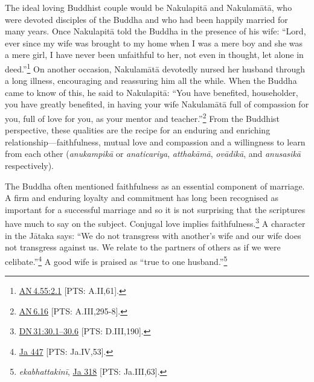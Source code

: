 \documentclass[10pt, openright]{book}
\begin{document}
The ideal loving Buddhist couple would be Nakulapitā and Nakulamātā, who were devoted disciples of the Buddha and who had been happily married for many years. Once Nakulapitā told the Buddha in the presence of his wife: “Lord, ever since my wife was brought to my home when I was a mere boy and she was a mere girl, I have never been unfaithful to her, not even in thought, let alone in deed.”\footnote {\href{https://suttacentral.net/an4.55/en/sujato\#2.1}{AN 4.55:2.1} [PTS: A.II,61].} On another occasion, Nakulamātā devotedly nursed her husband through a long illness, encouraging and reassuring him all the while. When the Buddha came to know of this, he said to Nakulapitā: “You have benefited, householder, you have greatly benefited, in having your wife Nakulamātā full of compassion for you, full of love for you, as your mentor and teacher.”\footnote {\href{https://suttacentral.net/an6.16/en/sujato}{AN 6.16} [PTS: A.III,295-8].} From the Buddhist perspective, these qualities are the recipe for an enduring and enriching relationship—faithfulness, mutual love and compassion and a willingness to learn from each other (\textit{anukampikā} or \textit{anaticariya}, \textit{atthakāmā}, \textit{ovādikā}, and \textit{anusasikā} respectively).


The Buddha often mentioned faithfulness as an essential component of marriage. A firm and enduring loyalty and commitment has long been recognised as important for a successful marriage and so it is not surprising that the scriptures have much to say on the subject. Conjugal love implies faithfulness.\footnote {\href{https://suttacentral.net/dn31/en/sujato\#30.1}{DN 31:30.1–30.6} [PTS: D.III,190].} A character in the Jātaka says: “We do not transgress with another’s wife and our wife does not transgress against us. We relate to the partners of others as if we were celibate.”\footnote {\href{https://suttacentral.net/ja447/en/rouse?reference=main/pts#pts-vp-pli53}{Ja 447} [PTS: Ja.IV,53].} A good wife is praised as “true to one husband.”\footnote {\textit{ekabhattakinī}, \href{https://suttacentral.net/ja318/en/francis-neil?reference=main/pts#pts-vp-pli63}{Ja 318} [PTS: Ja.III,63].}
\end{document}
